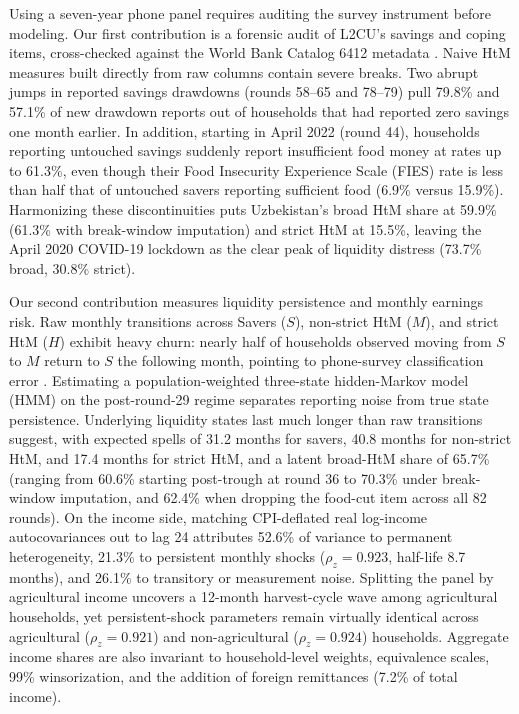 \documentclass[11pt]{article}
\begin{document}
Using a seven-year phone panel requires auditing the survey instrument before modeling. Our first contribution is a forensic audit of L2CU's savings and coping items, cross-checked against the World Bank Catalog 6412 metadata \citep{WB2025L2CU}. Naive HtM measures built directly from raw columns contain severe breaks. Two abrupt jumps in reported savings drawdowns (rounds 58--65 and 78--79) pull 79.8\% and 57.1\% of new drawdown reports out of households that had reported zero savings one month earlier. In addition, starting in April 2022 (round 44), households reporting untouched savings suddenly report insufficient food money at rates up to 61.3\%, even though their Food Insecurity Experience Scale (FIES) rate is less than half that of untouched savers reporting sufficient food (6.9\% versus 15.9\%). Harmonizing these discontinuities puts Uzbekistan's broad HtM share at 59.9\% (61.3\% with break-window imputation) and strict HtM at 15.5\%, leaving the April 2020 COVID-19 lockdown as the clear peak of liquidity distress (73.7\% broad, 30.8\% strict).

Our second contribution measures liquidity persistence and monthly earnings risk. Raw monthly transitions across Savers ($S$), non-strict HtM ($M$), and strict HtM ($H$) exhibit heavy churn: nearly half of households observed moving from $S$ to $M$ return to $S$ the following month, pointing to phone-survey classification error \citep{abowd1985effects}. Estimating a population-weighted three-state hidden-Markov model (HMM) on the post-round-29 regime separates reporting noise from true state persistence. Underlying liquidity states last much longer than raw transitions suggest, with expected spells of 31.2 months for savers, 40.8 months for non-strict HtM, and 17.4 months for strict HtM, and a latent broad-HtM share of 65.7\% (ranging from 60.6\% starting post-trough at round 36 to 70.3\% under break-window imputation, and 62.4\% when dropping the food-cut item across all 82 rounds). On the income side, matching CPI-deflated real log-income autocovariances out to lag 24 \citep{blundell2008consumption,guvenen2009empirical} attributes 52.6\% of variance to permanent heterogeneity, 21.3\% to persistent monthly shocks ($\rho_z = 0.923$, half-life 8.7 months), and 26.1\% to transitory or measurement noise. Splitting the panel by agricultural income uncovers a 12-month harvest-cycle wave among agricultural households, yet persistent-shock parameters remain virtually identical across agricultural ($\rho_z = 0.921$) and non-agricultural ($\rho_z = 0.924$) households. Aggregate income shares are also invariant to household-level weights, equivalence scales, 99\% winsorization, and the addition of foreign remittances (7.2\% of total income).
\end{document}
